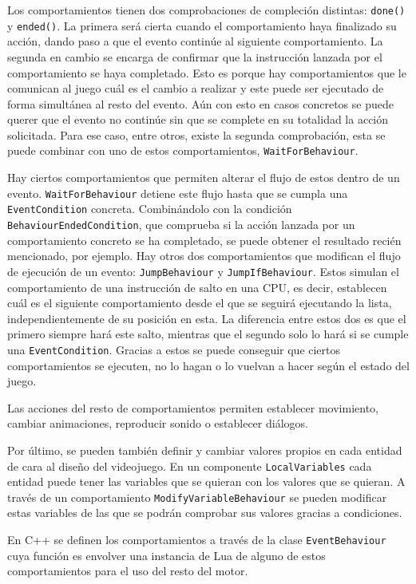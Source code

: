 \medskip

Los comportamientos tienen dos comprobaciones de compleción distintas: \texttt{done()} y \texttt{ended()}. La primera será cierta cuando el comportamiento haya finalizado su acción, dando paso a que el evento continúe al siguiente comportamiento. La segunda en cambio se encarga de confirmar que la instrucción lanzada por el comportamiento se haya completado. Esto es porque hay comportamientos que le comunican al juego cuál es el cambio a realizar y este puede ser ejecutado de forma simultánea al resto del evento. Aún con esto en casos concretos se puede querer que el evento no continúe sin que se complete en su totalidad la acción solicitada. Para ese caso, entre otros, existe la segunda comprobación, esta se puede combinar con uno de estos comportamientos, \texttt{WaitForBehaviour}.

\medskip

Hay ciertos comportamientos que permiten alterar el flujo de estos dentro de un evento. \texttt{WaitForBehaviour} detiene este flujo hasta que se cumpla una \texttt{EventCondition} concreta. Combinándolo con la condición \texttt{BehaviourEndedCondition}, que comprueba si la acción lanzada por un comportamiento concreto se ha completado, se puede obtener el resultado recién mencionado, por ejemplo. Hay otros dos comportamientos que modifican el flujo de ejecución de un evento: \texttt{JumpBehaviour} y \texttt{JumpIfBehaviour}. Estos simulan el comportamiento de una instrucción de salto en una CPU, es decir, establecen cuál es el siguiente comportamiento desde el que se seguirá ejecutando la lista, independientemente de su posición en esta. La diferencia entre estos dos es que el primero siempre hará este salto, mientras que el segundo solo lo hará si se cumple una \texttt{EventCondition}. Gracias a estos se puede conseguir que ciertos comportamientos se ejecuten, no lo hagan o lo vuelvan a hacer según el estado del juego.

\smallskip

Las acciones del resto de comportamientos permiten establecer movimiento, cambiar animaciones, reproducir sonido o establecer diálogos. 

\medskip

Por último, se pueden también definir y cambiar valores propios en cada entidad de cara al diseño del videojuego. En un componente \texttt{LocalVariables} cada entidad puede tener las variables que se quieran con los valores que se quieran. A través de un comportamiento \texttt{ModifyVariableBehaviour} se pueden modificar estas variables de las que se podrán comprobar sus valores gracias a condiciones. 

\medskip

En C++ se definen los comportamientos a través de la clase \texttt{EventBehaviour} cuya función es envolver una instancia de Lua de alguno de estos comportamientos para el uso del resto del motor. 